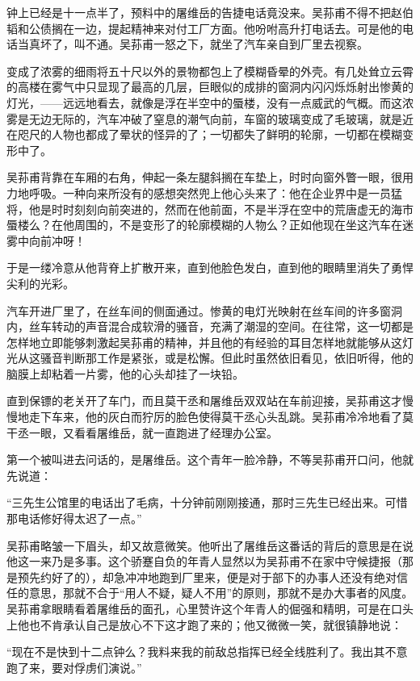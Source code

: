 \par 钟上已经是十一点半了，预料中的屠维岳的告捷电话竟没来。吴荪甫不得不把赵伯韬和公债搁在一边，提起精神来对付工厂方面。他吩咐高升打电话去。可是他的电话当真坏了，叫不通。吴荪甫一怒之下，就坐了汽车亲自到厂里去视察。
\par 变成了浓雾的细雨将五十尺以外的景物都包上了模糊昏晕的外壳。有几处耸立云霄的高楼在雾气中只显现了最高的几层，巨眼似的成排的窗洞内闪闪烁烁射出惨黄的灯光，——远远地看去，就像是浮在半空中的蜃楼，没有一点威武的气概。而这浓雾是无边无际的，汽车冲破了窒息的潮气向前，车窗的玻璃变成了毛玻璃，就是近在咫尺的人物也都成了晕状的怪异的了；一切都失了鲜明的轮廓，一切都在模糊变形中了。
\par 吴荪甫背靠在车厢的右角，伸起一条左腿斜搁在车垫上，时时向窗外瞥一眼，很用力地呼吸。一种向来所没有的感想突然兜上他心头来了：他在企业界中是一员猛将，他是时时刻刻向前突进的，然而在他前面，不是半浮在空中的荒唐虚无的海市蜃楼么？在他周围的，不是变形了的轮廓模糊的人物么？正如他现在坐这汽车在迷雾中向前冲呀！
\par 于是一缕冷意从他背脊上扩散开来，直到他脸色发白，直到他的眼睛里消失了勇悍尖利的光彩。
\par 汽车开进厂里了，在丝车间的侧面通过。惨黄的电灯光映射在丝车间的许多窗洞内，丝车转动的声音混合成软滑的骚音，充满了潮湿的空间。在往常，这一切都是怎样地立即能够刺激起吴荪甫的精神，并且他的有经验的耳目怎样地就能够从这灯光从这骚音判断那工作是紧张，或是松懈。但此时虽然依旧看见，依旧听得，他的脑膜上却粘着一片雾，他的心头却挂了一块铅。
\par 直到保镖的老关开了车门，而且莫干丞和屠维岳双双站在车前迎接，吴荪甫这才慢慢地走下车来，他的灰白而狞厉的脸色使得莫干丞心头乱跳。吴荪甫冷冷地看了莫干丞一眼，又看看屠维岳，就一直跑进了经理办公室。
\par 第一个被叫进去问话的，是屠维岳。这个青年一脸冷静，不等吴荪甫开口问，他就先说道：
\par “三先生公馆里的电话出了毛病，十分钟前刚刚接通，那时三先生已经出来。可惜那电话修好得太迟了一点。”
\par 吴荪甫略皱一下眉头，却又故意微笑。他听出了屠维岳这番话的背后的意思是在说他这一来乃是多事。这个骄蹇自负的年青人显然以为吴荪甫不在家中守候捷报（那是预先约好了的），却急冲冲地跑到厂里来，便是对于部下的办事人还没有绝对信任的意思，那就不合于“用人不疑，疑人不用”的原则，那就不是办大事者的风度。吴荪甫拿眼睛看着屠维岳的面孔，心里赞许这个年青人的倔强和精明，可是在口头上他也不肯承认自己是放心不下这才跑了来的；他又微微一笑，就很镇静地说：
\par “现在不是快到十二点钟么？我料来我的前敌总指挥已经全线胜利了。我出其不意跑了来，要对俘虏们演说。”
